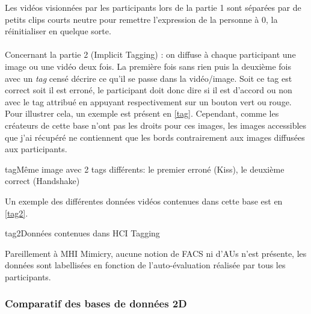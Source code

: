 \documentclass[overfullbox, poster]{polytech/polytech}
\begin{document}
Les vidéos visionnées par les participants lors de la partie 1 sont séparées par de petits clips courts neutre pour remettre l'expression de la personne à 0, la réinitialiser en quelque sorte.\\
\\
Concernant la partie 2 (Implicit Tagging) : on diffuse à chaque participant une image ou une vidéo deux fois. La première fois sans rien puis la deuxième fois avec un \textit{tag} censé décrire ce qu'il se passe dans la vidéo/image. Soit ce tag est correct soit il est erroné, le participant doit donc dire si il est d'accord ou non avec le tag attribué en appuyant respectivement sur un bouton vert ou rouge. Pour illustrer cela, un exemple est présent en \autoref{tag}. Cependant, comme les créateurs de cette base n'ont pas les droits pour ces images, les images accessibles que j'ai récupéré ne contiennent que les bords contrairement aux images diffusées aux participants.\\

\begin{Figure}{tag}{Même image avec 2 tags différents: le premier erroné (Kiss), le deuxième correct (Handshake)}
\end{Figure}

Un exemple des différentes données vidéos contenues dans cette base est en \autoref{tag2}.

\begin{Figure}{tag2}{Données contenues dans HCI Tagging}
\end{Figure}

Pareillement à MHI Mimicry, aucune notion de FACS ni d'AUs n'est présente, les données sont labellisées en fonction de l'auto-évaluation réalisée par tous les participants.

\newpage
\subsubsection{Comparatif des bases de données 2D}
\end{document}
